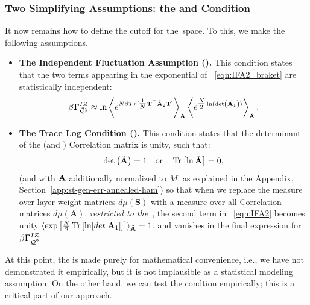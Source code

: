 \subsubsection{Two Simplifying Assumptions: the \IFA and \TRACELOG Condition}
\label{sxn:matgen_quality_hciz_C}

It now remains how to define the cutoff for the~\ECS space. To this, we make the following assumptions.
\begin{itemize}
\item
\textbf{The Independent Fluctuation Assumption (\IFA).}
This condition states that the two terms appearing in the exponential of \EQN~\ref{eqn:IFA2_braket} are statistically independent:
\begin{align}
  \label{eqn:IFA2}
  \beta\mathbf{\Gamma}^{IZ}_{\bar{\mathcal{Q}}^{2}} \approx \ln
  \left\langle
  e^{N\beta Tr[ \tfrac{1}{N}{\mathbf{T}}^{\top}\tilde{\mathbf{A}}_{2}{\mathbf{T}}] }
  \right\rangle_{\tilde{\mathbf{A}}}
  \left\langle
  e^{\tfrac{N}{2}\ln(\mbox{}{\text{det}}\left(\tilde{\mathbf{A}}_{1}\right))}
    \right\rangle_{\tilde{\mathbf{A}}}.
\end{align}

\item
\textbf{The Trace Log Condition (\TRACELOG).}
This condition states that the determinant of the \Student (and \Teacher) Correlation matrix is unity, such that:
\begin{align}
\label{eqn:tlc_mm}
\mbox{}{\text{det}}\left(\tilde{\mathbf{A}}\right)=1 
\quad\mbox{or}\quad
\mbox{}\operatorname{Tr}\left[\ln \tilde{\mathbf{A}}\right]=0  ,
\end{align}
(and with $\mathbf{A}$ additionally normalized to $M$, as explained in the Appendix, Section~\ref{app:st-gen-err-annealed-ham})
so that when we replace the measure over \Student layer weight matrices $d\mu(\mathbf{S})$ with a measure over all \Student Correlation matrices $d\mu(\mathbf{A})$,
\emph{restricted to the~\ECS}, the second term in \EQN~\ref{eqn:IFA2} becomes unity
$\langle \exp\left[\tfrac{N}{2} \mbox{}\operatorname{Tr}\left[ \ln[det\;\mathbf{A}_{1}] \right] \right]\rangle_{\tilde{\mathbf{A}}}=1$,
and vanishes in the final expression for $\beta\mathbf{\Gamma}^{IZ}_{\bar{\mathcal{Q}}^{2}}$\.

\end{itemize}

\noindent
At this point, the \IFA is made purely for mathematical convenience, i.e., 
we have not demonstrated it empirically, but it is not implausible as a statistical modeling assumption. 
On the other hand, we can test the \TRACELOG condtion empirically;
this is a critical part of our \SETOL approach.


